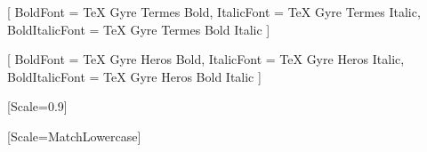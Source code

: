

\usepackage{fontspec}

\usepackage{polyglossia}
\setmainlanguage{vietnamese}

\setmainfont{TeX Gyre Termes}[
    BoldFont = TeX Gyre Termes Bold,
    ItalicFont = TeX Gyre Termes Italic,
    BoldItalicFont = TeX Gyre Termes Bold Italic
]

\setsansfont{TeX Gyre Heros}[
    BoldFont = TeX Gyre Heros Bold,
    ItalicFont = TeX Gyre Heros Italic,
    BoldItalicFont = TeX Gyre Heros Bold Italic
]

\setmonofont{Fira Code}[Scale=0.9]

[Scale=MatchLowercase]

\usepackage{unicode-math}

\usepackage[protrusion=true, expansion=true]{microtype}

\usepackage{xcolor}
\usepackage{minted} %
\usepackage{graphicx}
\graphicspath{{figures/}{chapters/ch2_background/}{chapters/ch3_methodology/}}
\usepackage{calc}
\usepackage{url}
\usepackage{amsmath}
\usepackage{caption}
\usepackage{subcaption}
\captionsetup{justification=centering, labelfont=bf}
\captionsetup[subfigure]{justification=centering}



